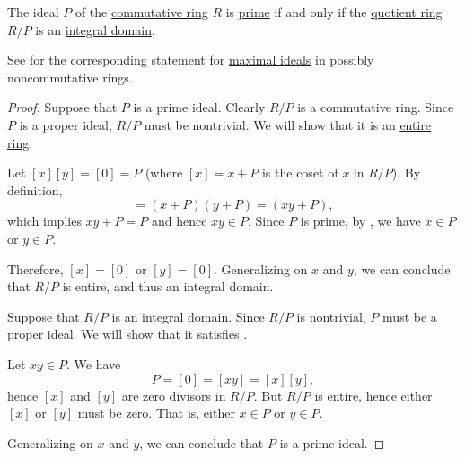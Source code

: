 \begin{proposition}\label{thm:quotient_by_prime_ideal}
  The ideal \( P \) of the \hyperref[def:ring/commutative]{commutative ring} \( R \) is \hyperref[def:semiring_ideal/prime]{prime} if and only if the \hyperref[def:ring/quotient]{quotient ring} \( R / P \) is an \hyperref[def:integral_domain]{integral domain}.
\end{proposition}
\begin{comments}
  \item See  for the corresponding statement for \hyperref[def:semiring_ideal/maximal]{maximal ideals} in possibly noncommutative rings.
\end{comments}
\begin{proof}
  \SufficiencySubProof Suppose that \( P \) is a prime ideal. Clearly \( R / P \) is a commutative ring. Since \( P \) is a proper ideal, \( R / P \) must be nontrivial. We will show that it is an \hyperref[def:entire_semiring]{entire ring}.

  Let \( [x] [y] = [0] = P \) (where \( [x] = x + P \) is the coset of \( x \) in \( R / P \)). By definition,
  \begin{equation*}
    [x] [y] = (x + P) (y + P) = (xy + P),
  \end{equation*}
  which implies \( xy + P = P \) and hence \( xy \in P \). Since \( P \) is prime, by , we have \( x \in P \) or \( y \in P \).

  Therefore, \( [x] = [0] \) or \( [y] = [0] \). Generalizing on \( x \) and \( y \), we can conclude that \( R / P \) is entire, and thus an integral domain.

  \NecessitySubProof Suppose that \( R / P \) is an integral domain. Since \( R / P \) is nontrivial, \( P \) must be a proper ideal. We will show that it satisfies .

  Let \( xy \in P \). We have
  \begin{equation*}
    P = [0] = [xy] = [x] [y],
  \end{equation*}
  hence \( [x] \) and \( [y] \) are zero divisors in \( R / P \). But \( R / P \) is entire, hence either \( [x] \) or \( [y] \) must be zero. That is, either \( x \in P \) or \( y \in P \).

  Generalizing on \( x \) and \( y \), we can conclude that \( P \) is a prime ideal.
\end{proof}

